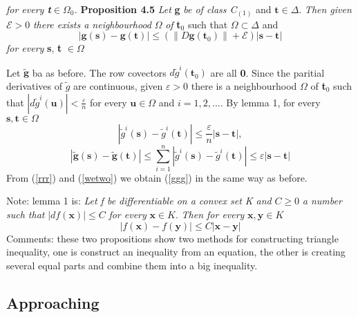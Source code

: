 \documentclass[titlepage,a4paper,12pt]{article}
\theoremstyle{nonumberplain}
\newtheorem{Proof}{\hskip 2em Proof}
\begin{document}
 \emph{for every \emph{\textbf{t}$\in$\textbf{$\Omega$$_0$}}.}
 \textbf{Proposition 4.5} \emph{Let} \textbf{g} \emph{be of class C}$_{(1)}$ and $\textbf{t}\in \Delta$. \emph{Then given} $\mathcal{E}>0$ \emph{there exists a neighbourhood} \textbf{$\Omega$} \emph{of} \textbf{t}$_0$ such that \textbf{$\Omega$}$\subset\Delta$ and
 \begin{equation}
 |\textbf{g}(\textbf{s})-\textbf{g}(\textbf{t})|\leq (\lVert D\textbf{g}(\textbf{t}_0)\rVert+\mathcal{E})|\textbf{s}-\textbf{t}|
 \label{ggg}
 \end{equation}
 \emph{for every} \textbf{s}, \textbf{t} $\in \Omega$
 \begin{Proof}
Let $\tilde{\textbf{g}}$ ba as before. The row covectors $d\tilde{g}^i(\textbf{t}_0)$ are all \textbf{0}. Since the paritial derivatives of $\tilde{g}$ are continuous, given $\varepsilon >0$ there is a neighbourhood $\Omega$ of \textbf{t}$_0$ such that $|d\tilde{g}^i(\textbf{u})|<\frac{\varepsilon}{n}$ for every $\textbf{u}\in \Omega$ and $i=1,2,\dotsc$. By lemma 1, for every $\textbf{s},\textbf{t}\in \Omega$
$$|\tilde{g}^i(\textbf{s})-\tilde{g}^i(\textbf{t})|\leq \frac{\varepsilon}{n}|\textbf{s}-\textbf{t}|,$$
\begin{equation}
|\tilde{\textbf{g}}(\textbf{s})-\tilde{\textbf{g}}(\textbf{t})|\leq \sum_{i=1}^n|\tilde{g}^i(\textbf{s})-\tilde{g}^i(\textbf{t})|\leq \varepsilon|\textbf{s}-\textbf{t}|
\tag{**}
\label{rrr}
\end{equation}
From (\ref{rrr}) and (\ref{wetwo}) we obtain (\ref{ggg}) in the same way as before.
 \end{Proof}
 Note: lemma 1 is: \emph{Let f be differentiable on a convex set K and} $C\geq 0$ \emph{a number such that} $|df(\textbf{x})|\leq C$ \emph{for every} $\textbf{x}\in K$. \emph{Then for every} $\textbf{x},\textbf{y}\in K$
 $$|f(\textbf{x})-f(\textbf{y})|\leq C|\textbf{x}-\textbf{y}|$$
 Comments: these two propositions show two methods for constructing triangle inequality, one is construct an inequality from an equation, the other is creating several equal parts and combine them into a big inequality. 



\subsection{Approaching}
\end{document}
